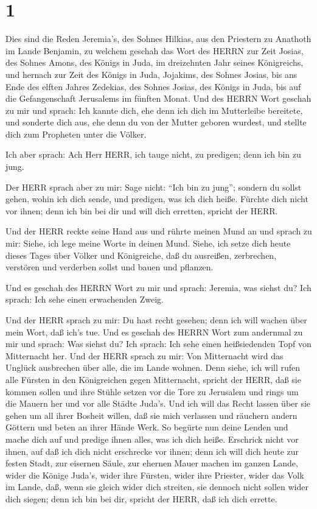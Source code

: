 \hypertarget{section}{%
\section{1}\label{section}}

 Dies sind die Reden Jeremia's, des Sohnes Hilkias, aus den
Priestern zu Anathoth im Lande Benjamin,  zu welchem geschah
das Wort des HERRN zur Zeit Josias, des Sohnes Amons, des Königs in
Juda, im dreizehnten Jahr seines Königreichs,  und hernach
zur Zeit des Königs in Juda, Jojakims, des Sohnes Josias, bis ans Ende
des elften Jahres Zedekias, des Sohnes Josias, des Königs in Juda, bis
auf die Gefangenschaft Jerusalems im fünften Monat.  Und des
HERRN Wort geschah zu mir und sprach:  Ich kannte dich, ehe
denn ich dich im Mutterleibe bereitete, und sonderte dich aus, ehe denn
du von der Mutter geboren wurdest, und stellte dich zum Propheten unter
die Völker.

 Ich aber sprach: Ach Herr HERR, ich tauge nicht, zu
predigen; denn ich bin zu jung.

 Der HERR sprach aber zu mir: Sage nicht: ``Ich bin zu
jung''; sondern du sollst gehen, wohin ich dich sende, und predigen, was
ich dich heiße.  Fürchte dich nicht vor ihnen; denn ich bin
bei dir und will dich erretten, spricht der HERR.

 Und der HERR reckte seine Hand aus und rührte meinen Mund
an und sprach zu mir: Siehe, ich lege meine Worte in deinen Mund.
 Siehe, ich setze dich heute dieses Tages über Völker und
Königreiche, daß du ausreißen, zerbrechen, verstören und verderben
sollst und bauen und pflanzen.

 Und es geschah des HERRN Wort zu mir und sprach: Jeremia,
was siehst du? Ich sprach: Ich sehe einen erwachenden Zweig.

 Und der HERR sprach zu mir: Du hast recht gesehen; denn
ich will wachen über mein Wort, daß ich's tue.  Und es
geschah des HERRN Wort zum andernmal zu mir und sprach: Was siehst du?
Ich sprach: Ich sehe einen heißsiedenden Topf von Mitternacht her.
 Und der HERR sprach zu mir: Von Mitternacht wird das
Unglück ausbrechen über alle, die im Lande wohnen.  Denn
siehe, ich will rufen alle Fürsten in den Königreichen gegen
Mitternacht, spricht der HERR, daß sie kommen sollen und ihre Stühle
setzen vor die Tore zu Jerusalem und rings um die Mauern her und vor
alle Städte Juda's.  Und ich will das Recht lassen über sie
gehen um all ihrer Bosheit willen, daß sie mich verlassen und räuchern
andern Göttern und beten an ihrer Hände Werk.  So begürte
nun deine Lenden und mache dich auf und predige ihnen alles, was ich
dich heiße. Erschrick nicht vor ihnen, auf daß ich dich nicht erschrecke
vor ihnen;  denn ich will dich heute zur festen Stadt, zur
eisernen Säule, zur ehernen Mauer machen im ganzen Lande, wider die
Könige Juda's, wider ihre Fürsten, wider ihre Priester, wider das Volk
im Lande,  daß, wenn sie gleich wider dich streiten, sie
dennoch nicht sollen wider dich siegen; denn ich bin bei dir, spricht
der HERR, daß ich dich errette.

